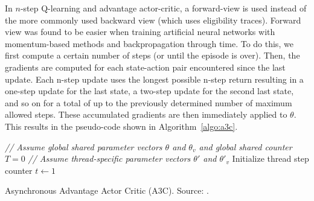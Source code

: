 In $n$-step Q-learning and advantage actor-critic, a forward-view is used instead of the more commonly used backward view (which uses eligibility traces).
Forward view was found to be easier when training artificial neural networks with momentum-based methods and backpropagation through time.
To do this, we first compute a certain number of steps (or until the episode is over).
Then, the gradients are computed for each state-action pair encountered since the last update.
Each n-step update uses the longest possible n-step return resulting in a one-step update for the last state, a two-step update for the second last state, and so on for a total of up to the previously determined number of maximum allowed steps.
These accumulated gradients are then immediately applied to $\theta$.
This results in the pseudo-code shown in Algorithm~\ref{algo:a3c}.\\
\begin{algorithm}[htb]
\DontPrintSemicolon
\emph{// Assume global shared parameter vectors $\theta$ and $\theta_v$ and global shared counter $T=0$}\;
\emph{// Assume thread-specific parameter vectors $\theta'$ and $\theta'_v$}\;
Initialize thread step counter $t\gets 1$\;
\caption[Asynchronous Advantage Actor Critic]{Asynchronous Advantage Actor Critic (A3C). Source: \cite{Mnih2016AsynchronousLearning}.}
\label{algo:a3c}
\end{algorithm}

